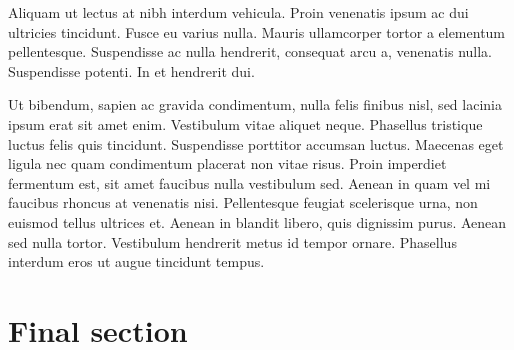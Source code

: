 \documentclass[11pt]{article}
\begin{document}
    Aliquam ut lectus at nibh interdum vehicula. Proin venenatis ipsum ac dui ultricies tincidunt. Fusce eu varius nulla. Mauris ullamcorper tortor a elementum pellentesque. Suspendisse ac nulla hendrerit, consequat arcu a, venenatis nulla. Suspendisse potenti. In et hendrerit dui.

    Ut bibendum, sapien ac gravida condimentum, nulla felis finibus nisl, sed lacinia ipsum erat sit amet enim. Vestibulum vitae aliquet neque. Phasellus tristique luctus felis quis tincidunt. Suspendisse porttitor accumsan luctus. Maecenas eget ligula nec quam condimentum placerat non vitae risus. Proin imperdiet fermentum est, sit amet faucibus nulla vestibulum sed. Aenean in quam vel mi faucibus rhoncus at venenatis nisi. Pellentesque feugiat scelerisque urna, non euismod tellus ultrices et. Aenean in blandit libero, quis dignissim purus. Aenean sed nulla tortor. Vestibulum hendrerit metus id tempor ornare. Phasellus interdum eros ut augue tincidunt tempus.

    \section{Final section}
\end{document}

